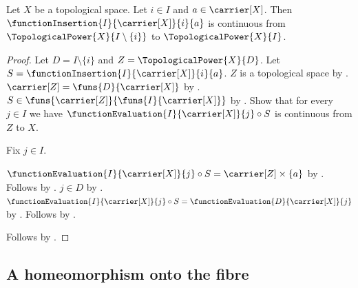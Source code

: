 \begin{theorem}\label{topological_power_insertion_continuous}
    Let $X$ be a topological space.
    Let $i\in I$ and $a\in\carrier[X]$.
    Then $\functionInsertion{I}{\carrier[X]}{i}{a}$ is continuous from
        $\TopologicalPower{X}{I\setminus\{i\}}$ to $\TopologicalPower{X}{I}$.
\end{theorem}
\begin{proof}
    Let $D=I\setminus\{i\}$ and $Z=\TopologicalPower{X}{D}$.
    Let $S=\functionInsertion{I}{\carrier[X]}{i}{a}$.
    $Z$ is a topological space by .
    $\carrier[Z]=\funs{D}{\carrier[X]}$ by .
    $S\in\funs{\carrier[Z]}{\funs{I}{\carrier[X]}}$ by .
    Show that for every $j\in I$ we have
        $\functionEvaluation{I}{\carrier[X]}{j}\circ S$ is continuous from $Z$ to $X$.
    \begin{subproof}
        Fix $j\in I$.
        \begin{byCase}
                $\functionEvaluation{I}{\carrier[X]}{j}\circ S=\carrier[Z]\times\{a\}$ by
                    .
                Follows by .
                $j\in D$ by .
                $\functionEvaluation{I}{\carrier[X]}{j}\circ S
                    =\functionEvaluation{D}{\carrier[X]}{j}$ by
                    .
                Follows by .
        \end{byCase}
    \end{subproof}
    Follows by .
\end{proof}

\subsection{A homeomorphism onto the fibre}

